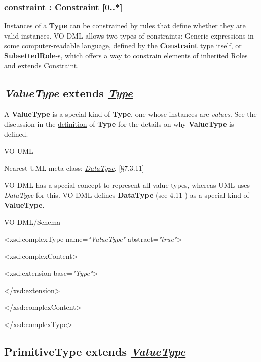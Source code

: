 \documentclass[10pt,a4paper]{ivoa}
\begin{document}
\hypertarget{constraint-constraint-0..}{%
\subsubsection{constraint : Constraint
{[}0..*{]}}\label{constraint-constraint-0..}}

Instances of a \textbf{Type} can be constrained by rules that define
whether they are valid instances. VO-DML allows two types of
constraints: Generic expressions in some computer-readable language,
defined by the \protect\hyperlink{constraint}{\textbf{Constraint}} type
itself, or
\protect\hyperlink{subsettedrole-extends-constraint}{\textbf{SubsettedRole}}-s,
which offers a way to constrain elements of inherited Roles and extends
Constraint.

\hypertarget{valuetype-extends-type}{%
\subsection{\texorpdfstring{\emph{ValueType} extends
\protect\hyperlink{type-extends-referableelement}{\emph{Type}}}{ValueType extends Type}}\label{valuetype-extends-type}}

A \textbf{ValueType} is a special kind of \textbf{Type}, one whose
instances are \emph{values}. See the discussion in the
\protect\hyperlink{type-extends-referableelement}{definition} of
\textbf{Type} for the details on why \textbf{ValueType} is defined.

VO-UML

Nearest UML meta-class:
\href{http://www.uml-diagrams.org/class-diagrams.html\#data-type}{\emph{DataType}}.
{[}§7.3.11{]}

VO-DML has a special concept to represent all value types, whereas UML
uses \emph{DataType} for this. VO-DML defines \textbf{DataType} (see
4.11 ) as a special kind of \textbf{ValueType}.

VO-DML/Schema

\textless xsd:complexType name=\emph{"ValueType"}
abstract=\emph{"true"}\textgreater{}

\textless xsd:complexContent\textgreater{}

\textless xsd:extension base=\emph{"Type"}\textgreater{}

\textless/xsd:extension\textgreater{}

\textless/xsd:complexContent\textgreater{}

\textless/xsd:complexType\textgreater{}

\hypertarget{primitivetype-extends-valuetype}{%
\subsection{\texorpdfstring{PrimitiveType extends
\protect\hyperlink{valuetype-extends-type}{\emph{ValueType}}}{PrimitiveType extends ValueType}}\label{primitivetype-extends-valuetype}}
\end{document}

